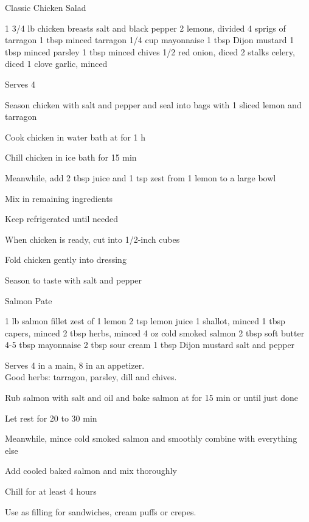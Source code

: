 
\begin{denserecipe}{Classic Chicken Salad}{}
\begin{ingredients}
1 3/4 lb chicken breasts
salt and black pepper
2 lemons, divided
4 sprigs of tarragon
1 tbsp minced tarragon
1/4 cup mayonnaise
1 tbsp Dijon mustard
1 tbsp minced parsley
1 tbsp minced chives
1/2 red onion, diced
2 stalks celery, diced
1 clove garlic, minced
\end{ingredients}
\nextcolumn
Serves 4
\begin{steps}
    \item Season chicken with salt and pepper and seal into bags with 1 sliced lemon and tarragon
    \item Cook chicken in water bath at  for 1 h
    \item Chill chicken in ice bath for 15 min
    \item Meanwhile, add 2 tbsp juice and 1 tsp zest from 1 lemon to a large bowl
    \item Mix in remaining ingredients
    \item Keep refrigerated until needed
    \item When chicken is ready, cut into 1/2-inch cubes
    \item Fold chicken gently into dressing
    \item Season to taste with salt and pepper
\end{steps}
\end{denserecipe}

\begin{denserecipe}{Salmon Pate}{}
\begin{ingredients}
1 lb salmon fillet
zest of 1 lemon
2 tsp lemon juice
1 shallot, minced
1 tbsp capers, minced
2 tbsp herbs, minced
4 oz cold smoked salmon
2 tbsp soft butter
4-5 tbsp mayonnaise
2 tbsp sour cream
1 tbsp Dijon mustard
salt and pepper
\end{ingredients}
\nextcolumn
Serves 4 in a main, 8 in an appetizer. \\
Good herbs: tarragon, parsley, dill and chives.
\begin{steps}
\item Rub salmon with salt and oil and bake salmon at  for 15 min or until just done
\item Let rest for 20 to 30 min
\item Meanwhile, mince cold smoked salmon and smoothly combine with everything else
\item Add cooled baked salmon and mix thoroughly
\item Chill for at least 4 hours
\end{steps}
Use as filling for sandwiches, cream puffs or crepes. 
\end{denserecipe}

